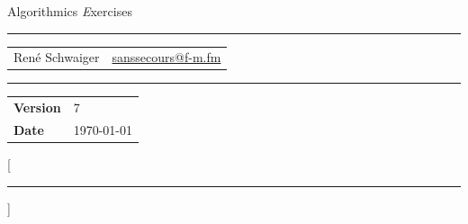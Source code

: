 \documentclass[a4paper, 12pt]{report}
\makeatletter
\newcommand{\Title}{Algorithmics}
\newcommand{\TitleDescription}{Exercises}
\newcommand{\Version}{7}
\newcommand{\AuthorOne}{René Schwaiger}
\newcommand{\MailOne}{\href{mailto:sanssecours@f-m.fm}{sanssecours@f-m.fm}}
\makeatother
\begin{document}
\begin{titlepage}

    \begin{center}
        {\Huge\Zapfino \Title}
        \vskip 0.5cm
        {\Large\textit\TitleDescription}
        \vskip 1cm
        \hrule
        \vskip 0.5cm
        \begin{tabular}{p{8cm}l}
            \AuthorOne  & \MailOne\\
        \end{tabular}
        \vskip 0.5cm
        \hrule
        \vskip 13.5cm
    \end{center}

    \begin{leftbar}
        \begin{tabular}{ll}
            \textbf{Version}    & \Version\\
            \textbf{Date}       & \today
        \end{tabular}
    \end{leftbar}

\end{titlepage}


\titlespacing*{\chapter}{0pt}{-30pt}{10pt}
\titleformat{\chapter}{\sffamily\bfseries\large}{}{0pt}{}[{\color{aqua}\hrule}]

\makeatletter \renewcommand{\@dotsep}{10000} \makeatother
\pagestyle{empty}
\newpage
\setcounter{page}{2}

\tableofcontents
\thispagestyle{empty}

\end{document}
